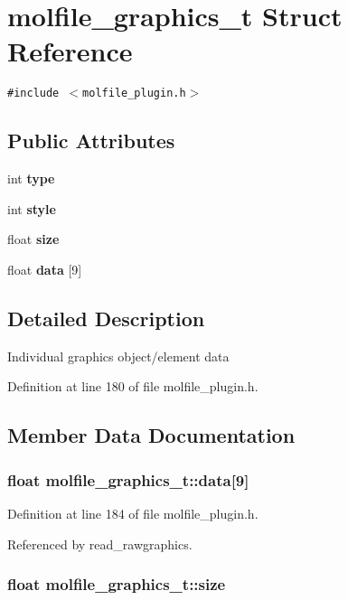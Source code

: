 \section{molfile\_\-graphics\_\-t  Struct Reference}
\label{structmolfile__graphics__t}
{\tt \#include $<$molfile\_\-plugin.h$>$}

\subsection*{Public Attributes}
\begin{CompactItemize}
\item 
int {\bf type}
\item 
int {\bf style}
\item 
float {\bf size}
\item 
float {\bf data} [9]
\end{CompactItemize}


\subsection{Detailed Description}
Individual graphics object/element data 



Definition at line 180 of file molfile\_\-plugin.h.

\subsection{Member Data Documentation}
\subsubsection{\setlength{\rightskip}{0pt plus 5cm}float molfile\_\-graphics\_\-t::data[9]}\label{structmolfile__graphics__t_m3}




Definition at line 184 of file molfile\_\-plugin.h.

Referenced by read\_\-rawgraphics.
\subsubsection{\setlength{\rightskip}{0pt plus 5cm}float molfile\_\-graphics\_\-t::size}\label{structmolfile__graphics__t_m2}




